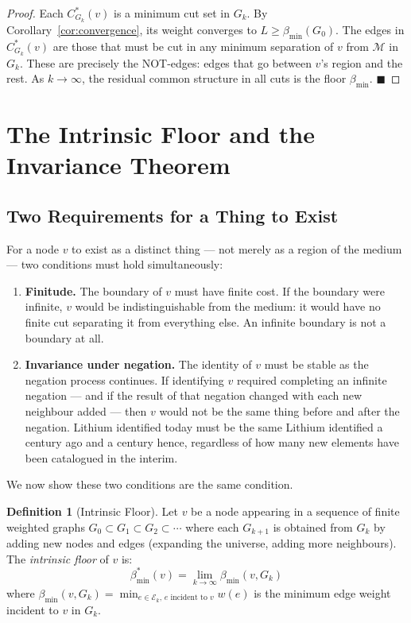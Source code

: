 \documentclass[11pt,twocolumn,a4paper]{article}
\theoremstyle{plain}
\theoremstyle{definition}
\newtheorem{definition}[theorem]{Definition}
\theoremstyle{remark}
\newcommand{\med}{\mathcal{M}}
\newcommand{\Ecal}{\mathcal{E}}
\newcommand{\bmin}{\beta_{\min}}
\renewcommand{\qed}{\hfill$\blacksquare$}
\begin{document}
\begin{proof}
Each $C^*_{G_k}(v)$ is a minimum cut set in $G_k$. By
Corollary~\ref{cor:convergence}, its weight converges to $L \geq \bmin(G_0)$.
The edges in $C^*_{G_k}(v)$ are those that must be cut in any minimum
separation of $v$ from $\med$ in $G_k$. These are precisely the NOT-edges:
edges that go between $v$'s region and the rest. As $k \to \infty$, the
residual common structure in all cuts is the floor $\bmin$. \qed
\end{proof}

\section{The Intrinsic Floor and the Invariance Theorem}
\label{sec:invariance}

\subsection{Two Requirements for a Thing to Exist}

For a node $v$ to exist as a distinct thing --- not merely as a region of the
medium --- two conditions must hold simultaneously:

\begin{enumerate}[label=(\roman*)]
  \item \textbf{Finitude.} The boundary of $v$ must have finite cost. If the
  boundary were infinite, $v$ would be indistinguishable from the medium: it
  would have no finite cut separating it from everything else. An infinite
  boundary is not a boundary at all.

  \item \textbf{Invariance under negation.} The identity of $v$ must be stable
  as the negation process continues. If identifying $v$ required completing an
  infinite negation --- and if the result of that negation changed with each
  new neighbour added --- then $v$ would not be the same thing before and after
  the negation. Lithium identified today must be the same Lithium identified
  a century ago and a century hence, regardless of how many new elements have
  been catalogued in the interim.
\end{enumerate}

We now show these two conditions are the same condition.

\begin{definition}[Intrinsic Floor]
\label{def:intrinsic_floor}
Let $v$ be a node appearing in a sequence of finite weighted graphs $G_0
\subset G_1 \subset G_2 \subset \cdots$ where each $G_{k+1}$ is obtained
from $G_k$ by adding new nodes and edges (expanding the universe, adding more
neighbours). The \emph{intrinsic floor} of $v$ is:
\[
  \bmin^*(v) = \lim_{k \to \infty} \bmin(v, G_k)
\]
where $\bmin(v, G_k) = \min_{e \in \Ecal_k,\, e \text{ incident to } v} w(e)$
is the minimum edge weight incident to $v$ in $G_k$.
\end{definition}
\end{document}
